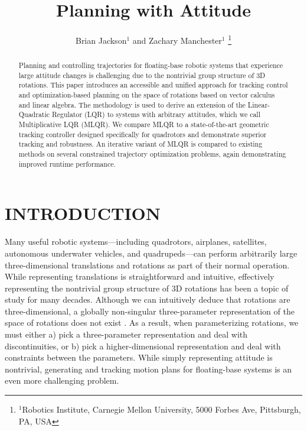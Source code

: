 \documentclass[letterpaper, 10 pt, conference]{ieeeconf}  %
\title{\LARGE \bf
Planning with Attitude
}
\author{Brian Jackson$^1$ and Zachary Manchester$^1$%
    \thanks{
        $^1$Robotics Institute, 
        Carnegie Mellon University, 
        5000 Forbes Ave, Pittsburgh, PA, USA
    }
}
\begin{document}
\maketitle

\begin{abstract}
Planning and controlling trajectories for floating-base robotic systems that experience
large attitude changes is challenging due to the nontrivial group structure of 3D
rotations. This paper introduces an accessible and unified approach for tracking control
and optimization-based planning on the space of rotations based on vector calculus and
linear algebra. The methodology is used to derive an extension of the Linear-Quadratic
Regulator (LQR) to systems with arbitrary attitudes, which we call Multiplicative LQR
(MLQR). We compare MLQR to a state-of-the-art geometric tracking controller designed
specifically for quadrotors and demonstrate superior tracking and robustness. An
iterative variant of MLQR is compared to existing methods on several constrained
trajectory optimization problems, again demonstrating improved runtime performance. 
\end{abstract}

\section{INTRODUCTION}
    Many useful robotic systems---including quadrotors, airplanes, satellites, autonomous 
    underwater vehicles, and quadrupeds---can perform arbitrarily large three-dimensional 
    translations and rotations as part of their normal operation. 
    While representing translations is straightforward and intuitive, effectively 
    representing the nontrivial group structure of 3D rotations has been a topic of study 
    for many decades. Although we can intuitively deduce that rotations are three-dimensional, 
    a globally non-singular three-parameter representation of the space of rotations does 
    not exist \cite{stuelpnagel1964parametrization}. As a result, when parameterizing rotations, 
    we must either a) pick a three-parameter representation and deal with discontinuities, 
    or b) pick a higher-dimensional representation and deal with constraints between the 
    parameters. While simply representing attitude is nontrivial, generating and tracking 
    motion plans for floating-base systems is an even more challenging problem.
    
\end{document}
